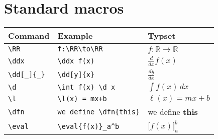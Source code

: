 \documentclass{article}
\newcommand{\RR}{\mathbb R}
\renewcommand{\d}{\,d}
\newcommand{\dd}[2][]{\frac{d #1}{d #2}}
\renewcommand{\l}{\ell}
\newcommand{\ddx}{\frac{d}{dx}}
\newcommand{\dfn}{\textbf}
\newcommand{\eval}[1]{\bigg[ #1 \bigg]}
\newcommand{\fxn}{}
\begin{document}
\section*{Standard macros}

\renewcommand{\arraystretch}{2}
\begin{tabular*}{1.0\textwidth}{lll}
\hline
Command & Example & Typset \\
\hline
\verb|\RR| & \verb|f:\RR\to\RR| & $f:\RR\to\RR$\\ 
\verb|\ddx| & \verb|\ddx f(x)| & $\ddx f(x)$\\
\verb|\dd[_]{_}| & \verb|\dd[y]{x}| & $\dd[y]{x}$ \\
\verb|\d | & \verb|\int f(x) \d x| & $\int f(x) \d x$\\
\verb|\l| & \verb|\l(x) = mx+b| & $\l(x) = mx +b$\\
\verb|\dfn| & \verb|we define \dfn{this}| & we define \dfn{this}\\
\verb|\eval| & \verb|\eval{f(x)}_a^b| & $\eval{f(x)}_a^b$
\end{tabular*}
\end{document}
